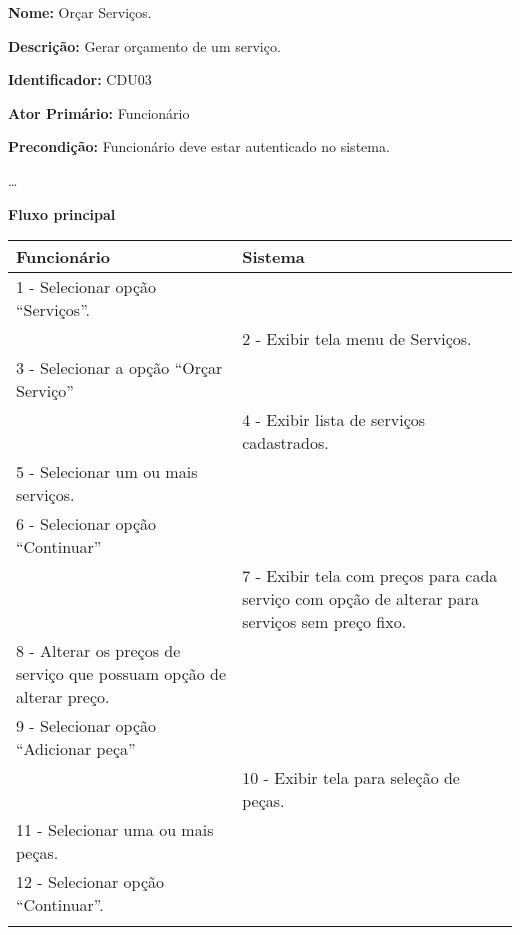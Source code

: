 	\par
	\textbf{Nome:} Orçar Serviços.
	\par
	\textbf{Descrição:} Gerar orçamento de um serviço. 
	\par 
	\textbf{Identificador:} CDU03
	\par
	\textbf{Ator Primário:} Funcionário	
	\par
	\textbf{Precondição:} Funcionário deve estar autenticado no sistema.
	\par	
	\ldots
	\par
	\textbf{Fluxo principal}\par
	\begin{tabular}{|p{7cm}|p{7cm}|}
		\hline 
		Funcionário & Sistema \\ 
		\hline 
		
		
		1 - Selecionar opção “Serviços”. 
		&  \\ 
		\hline 
		& 
		
		2 - Exibir tela menu de Serviços.
		\\ 
		\hline 
		
		
		3 - Selecionar a opção “Orçar Serviço”
		&  \\ 
		\hline 
		& 
		
		4 - Exibir lista de serviços cadastrados.
		\\ 
		\hline 
		
		
		5 - Selecionar um ou mais serviços.
		&  \\ 
		\hline 
		
		
		6 - Selecionar opção “Continuar”
		&  \\ 
		\hline 
		& 
		
		7 - Exibir tela com preços para cada serviço com opção de alterar para serviços sem preço fixo. 
		\\ 
		\hline 
		
		
		8 - Alterar os preços de serviço que possuam opção de alterar preço.
		&  \\ 
		\hline 
		
		
		9 - Selecionar opção “Adicionar peça”
		&  \\ 
		\hline 
		& 
		
		10 - Exibir tela para seleção de peças. 
		\\ 
		\hline 
		
		
		11 - Selecionar uma ou mais peças.
		&  \\ 
		\hline 
		
		
		12 - Selecionar opção “Continuar”.
		&  \\ 
		\hline 
		& 
		

\end{tabular}
